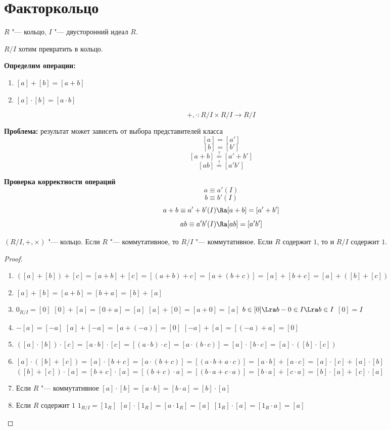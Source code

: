 ﻿\section{Факторкольцо}

$R$ "--- кольцо, $I$ "--- двусторонний идеал $R$.

$R / I$ хотим превратить в кольцо.

\textbf{Определим операции:}
\begin{enumerate}
	\item $[a] + [b] = [a + b]$
	\item $[a] \cdot [b] = [a \cdot b]$
\end{enumerate}	
\[+, \cdot \colon R/I \times R/I \to R/I\]
	
\textbf{Проблема:}
результат может зависеть от выбора представителей класса
\[[a] = [a']\]
\[[b] = [b']\]
\[[a + b] \overset{?}{=} [a' + b']\]
\[[ab] \overset{?}{=} [a'b']\]
	
\textbf{Проверка корректности операций}
\[a \equiv a' (I)\]
\[b \equiv b' (I)\]
\[a + b \equiv a' + b' (I) \Ra [a + b] = [a' + b']\]
\[ab \equiv a'b' (I) \Ra [ab] = [a'b']\]
	
\begin{theorem}
	$(R/I, +, \times)$ "--- кольцо.
	Если $R$ "--- коммутативное, то $R/I$ "--- коммутативное.
	Если $R$ содержит $1$,  то и $R/I$ содержит $1$.
\end{theorem}

\begin{proof}
	 \begin{enumerate}
	 	\item $([a] + [b]) + [c] = [a + b] + [c] = [(a + b) + c] =
	 		[a + (b + c)] = [a] + [b + c] = [a] + ([b] + [c])$
	 	\item $[a] + [b] = [a + b] = [b + a] = [b] + [a]$
		\item $0_{R/I} = [0]$
			$[0] + [a] = [0 + a] = [a]$
	 		$[a] + [0] = [a + 0] = [a]$
	 		$b \in [0] \Lra b - 0 \in I \Lra b \in I$
	 		$[0] = I$
	 	\item $-[a] = [-a]$
	 		$[a] + [-a] = [a + (-a)] = [0]$
	 		$[-a] + [a] = [(-a) + a] = [0]$
	 	\item $([a] \cdot [b]) \cdot [c] = [a \cdot b] \cdot [c] =
	 		[(a \cdot b) \cdot c] = [a \cdot (b \cdot c)] =
	 		[a] \cdot [b \cdot c] = [a] \cdot ([b] \cdot [c])$
	 	\item $[a] \cdot ([b] + [c]) = [a] \cdot [b + c] = 
	 		[a \cdot (b + c)] = [(a \cdot b + a \cdot c)] = 
	 		[a \cdot b] + [a \cdot c] = [a] \cdot [c] + [a] \cdot [b]$
	 		$([b] + [c]) \cdot [a]  = [b + c] \cdot [a] = 
	 		[(b + c)  \cdot a] = [(b \cdot a + c \cdot a)] = 
	 		[b \cdot a] + [c \cdot a] = [b] \cdot [a] + [c] \cdot [a]$
	 	\item Если $R$ "--- коммутативное
	 		$[a] \cdot [b] = [a \cdot b] = [b \cdot a] = [b] \cdot [a]$
	 	\item Если $R$ содержит $1$
	 		$1_{R/I} = [1_R]$
			$[a] \cdot [1_R] = [a \cdot 1_R] = [a]$
	 		$[1_R] \cdot [a] = [1_R \cdot a] = [a]$
	\end{enumerate}
\end{proof}
	 
